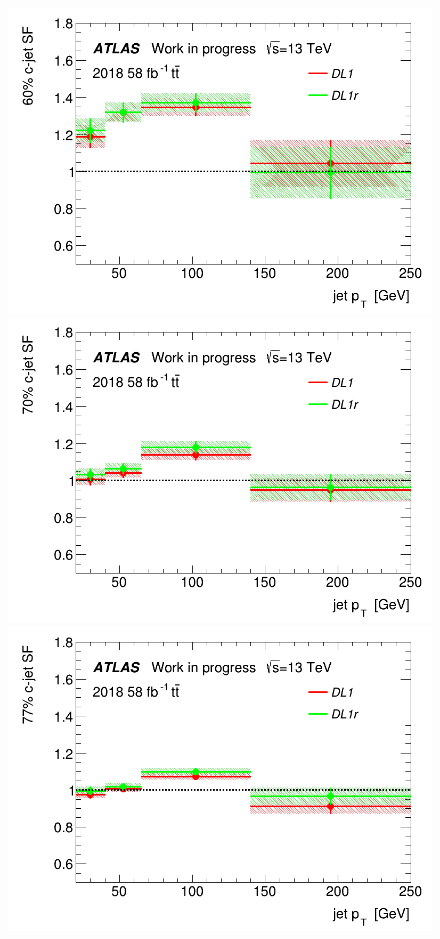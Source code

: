 \documentclass[letterpaper,12pt]{article}
\begin{document}
\begin{figure}[H]
\begin{minipage}[b]{.45\textwidth}
\centering
\includegraphics[width=1\textwidth]{March_highpT/SF60.png}
\end{minipage}\hfill
\begin{minipage}[b]{.45\textwidth}
\centering
\includegraphics[width=1\textwidth]{March_highpT/SF70.png}
\end{minipage}\hfill
\begin{minipage}[b]{.45\textwidth}
\centering
\includegraphics[width=1\textwidth]{March_highpT/SF77.png}

\end{minipage}
\end{figure}
\end{document}
